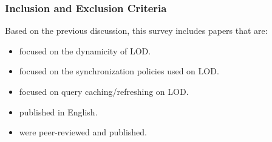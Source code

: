 \documentclass[sw]{iosart2x}
\begin{document}

%
%
%
%
%
%
%
%

\subsubsection{Inclusion and Exclusion Criteria}\label{Criteria}

Based on the previous discussion, this survey includes papers that are:

\begin{itemize}

\item focused on the dynamicity of LOD.

\item focused on the synchronization policies used on LOD.

\item focused on query caching/refreshing on LOD.

\item published in English.

\item were peer-reviewed and published.

\end{itemize}
\end{document}
